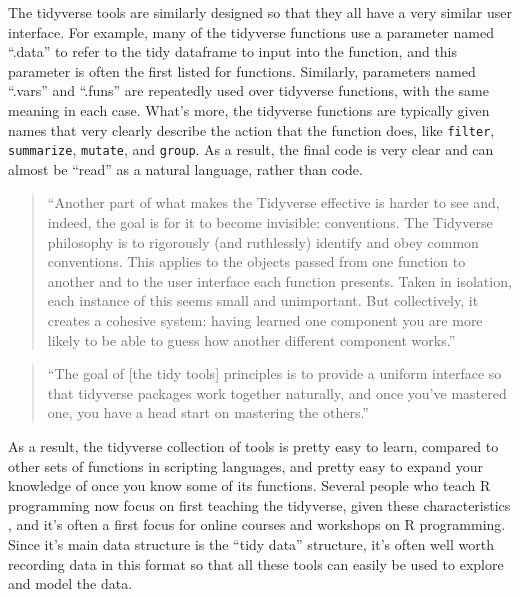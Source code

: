 \documentclass[]{tufte-book}
\begin{document}
The tidyverse tools are similarly designed so that they all have a very similar
user interface. For example, many of the tidyverse functions use a parameter
named ``.data'' to refer to the tidy dataframe to input into the function, and
this parameter is often the first listed for functions. Similarly, parameters
named ``.vars'' and ``.funs'' are repeatedly used over tidyverse functions, with the
same meaning in each case. What's more, the tidyverse functions are typically given names
that very clearly describe the action that the function does, like \texttt{filter},
\texttt{summarize}, \texttt{mutate}, and \texttt{group}. As a result, the final code is very clear
and can almost be ``read'' as a natural language, rather than code.

\begin{quote}
``Another part of what makes the Tidyverse effective is harder to see and,
indeed, the goal is for it to become invisible: conventions. The Tidyverse
philosophy is to rigorously (and ruthlessly) identify and obey common
conventions. This applies to the objects passed from one function to another
and to the user interface each function presents. Taken in isolation, each
instance of this seems small and unimportant. But collectively, it creates
a cohesive system: having learned one component you are more likely to be
able to guess how another different component works.'' \citep{bryan2017data}
\end{quote}

\begin{quote}
``The goal of {[}the tidy tools{]} principles is to provide a uniform interface so
that tidyverse packages work together naturally, and once you've mastered one,
you have a head start on mastering the others.'' \citep{wickhem2017tidy}
\end{quote}

As a result, the tidyverse collection of tools is pretty easy to learn, compared
to other sets of functions in scripting languages, and pretty easy to expand
your knowledge of once you know some of its functions. Several people who teach
R programming now focus on first teaching the tidyverse, given these
characteristics \citep{robinson2017teach, peng2018teaching}, and it's often a
first focus for online courses and workshops on R programming. Since it's main
data structure is the ``tidy data'' structure, it's often well worth recording
data in this format so that all these tools can easily be used to explore and
model the data.
\end{document}
